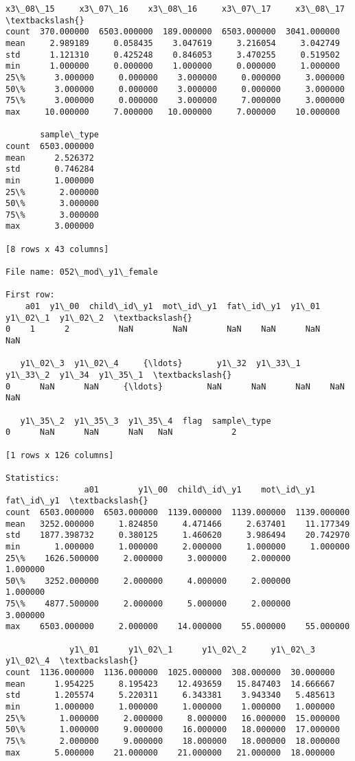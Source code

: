 \documentclass[11pt]{article}
\begin{document}
\begin{Verbatim}[commandchars=\\\{\}]
         x3\_08\_15     x3\_07\_16    x3\_08\_16     x3\_07\_17     x3\_08\_17  \textbackslash{}
count  370.000000  6503.000000  189.000000  6503.000000  3041.000000   
mean     2.989189     0.058435    3.047619     3.216054     3.042749   
std      1.121310     0.425248    0.846053     3.470255     0.519502   
min      1.000000     0.000000    1.000000     0.000000     1.000000   
25\%      3.000000     0.000000    3.000000     0.000000     3.000000   
50\%      3.000000     0.000000    3.000000     0.000000     3.000000   
75\%      3.000000     0.000000    3.000000     7.000000     3.000000   
max     10.000000     7.000000   10.000000     7.000000    10.000000   

       sample\_type  
count  6503.000000  
mean      2.526372  
std       0.746284  
min       1.000000  
25\%       2.000000  
50\%       3.000000  
75\%       3.000000  
max       3.000000  

[8 rows x 43 columns]

File name: 052\_mod\_y1\_female

First row: 
    a01  y1\_00  child\_id\_y1  mot\_id\_y1  fat\_id\_y1  y1\_01  y1\_02\_1  y1\_02\_2  \textbackslash{}
0    1      2          NaN        NaN        NaN    NaN      NaN      NaN   

   y1\_02\_3  y1\_02\_4     {\ldots}       y1\_32  y1\_33\_1  y1\_33\_2  y1\_34  y1\_35\_1  \textbackslash{}
0      NaN      NaN     {\ldots}         NaN      NaN      NaN    NaN      NaN   

   y1\_35\_2  y1\_35\_3  y1\_35\_4  flag  sample\_type  
0      NaN      NaN      NaN   NaN            2  

[1 rows x 126 columns]

Statistics: 
                a01        y1\_00  child\_id\_y1    mot\_id\_y1    fat\_id\_y1  \textbackslash{}
count  6503.000000  6503.000000  1139.000000  1139.000000  1139.000000   
mean   3252.000000     1.824850     4.471466     2.637401    11.177349   
std    1877.398732     0.380125     1.460620     3.986494    20.742970   
min       1.000000     1.000000     2.000000     1.000000     1.000000   
25\%    1626.500000     2.000000     3.000000     2.000000     1.000000   
50\%    3252.000000     2.000000     4.000000     2.000000     1.000000   
75\%    4877.500000     2.000000     5.000000     2.000000     3.000000   
max    6503.000000     2.000000    14.000000    55.000000    55.000000   

             y1\_01      y1\_02\_1      y1\_02\_2     y1\_02\_3    y1\_02\_4  \textbackslash{}
count  1136.000000  1136.000000  1025.000000  308.000000  30.000000   
mean      1.954225     8.195423    12.493659   15.847403  14.666667   
std       1.205574     5.220311     6.343381    3.943340   5.485613   
min       1.000000     1.000000     1.000000    1.000000   1.000000   
25\%       1.000000     2.000000     8.000000   16.000000  15.000000   
50\%       1.000000     9.000000    16.000000   18.000000  17.000000   
75\%       2.000000     9.000000    18.000000   18.000000  18.000000   
max       5.000000    21.000000    21.000000   21.000000  18.000000   


\end{Verbatim}
\end{document}
